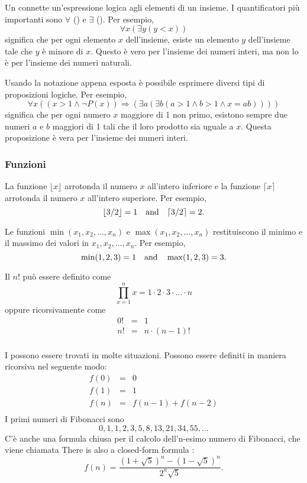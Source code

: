 
Un  connette un'espressione logica 
agli elementi di un insieme. 
I quantificatori più importanti sono
$\forall$ () e $\exists$ ().
Per esempio,
\[\forall x (\exists y (y < x))\]
significa che per ogni elemento $x$ dell'insieme,
esiste un elemento $y$ dell'insieme tale che
$y$ è minore di $x$.
Questo è vero per l'insieme dei numeri interi, 
ma non lo è per l'insieme dei numeri naturali. 

Usando la notazione appena esposta è possibile
esprimere diversi tipi di proposizioni logiche.
Per esempio,
\[\forall x ((x>1 \land \lnot P(x)) \Rightarrow (\exists a (\exists b (a > 1 \land b > 1 \land x = ab))))\]
significa che per ogni numero $x$ maggiore di 1 non primo,
esistono sempre due numeri $a$ e $b$ maggiori di 1 tali che
il loro prodotto sia uguale a $x$.
Questa proposizione è vera per l'insieme dei numeri interi.

\subsubsection{Funzioni}
La funzione $\lfloor x \rfloor$ arrotonda il numero $x$
all'intero inferiore e la funzione
$\lceil x \rceil$ arrotonda il numero $x$
all'intero superiore. 
Per esempio,
\[ \lfloor 3/2 \rfloor = 1 \hspace{10px} \textrm{and} \hspace{10px} \lceil 3/2 \rceil = 2.\]

Le funzioni $\min(x_1,x_2,\ldots,x_n)$
e $\max(x_1,x_2,\ldots,x_n)$
restituiscono il minimo e il massimo dei valori in
$x_1,x_2,\ldots,x_n$.
Per esempio,
\[ \min(1,2,3)=1 \hspace{10px} \textrm{and} \hspace{10px} \max(1,2,3)=3.\]


Il  $n!$ può essere definito come
\[\prod_{x=1}^n x = 1 \cdot 2 \cdot 3 \cdot \ldots \cdot n\]
oppure ricorsivamente come
\[
\begin{array}{lcl}
0! & = & 1 \\
n! & = & n \cdot (n-1)! \\
\end{array}
\]


I 
possono essere trovati in molte situazioni.
Possono essere definiti in maniera ricorsiva nel seguente modo:
\[
\begin{array}{lcl}
f(0) & = & 0 \\
f(1) & = & 1 \\
f(n) & = & f(n-1)+f(n-2) \\
\end{array}
\]
I primi numeri di Fibonacci sono
\[0, 1, 1, 2, 3, 5, 8, 13, 21, 34, 55, \ldots\]
C'è anche una formula chiusa per il calcolo 
dell'n-esimo numero di Fibonacci, che viene chiamata
There is also a closed-form formula
 :
\[f(n)=\frac{(1 + \sqrt{5})^n - (1-\sqrt{5})^n}{2^n \sqrt{5}}.\]

